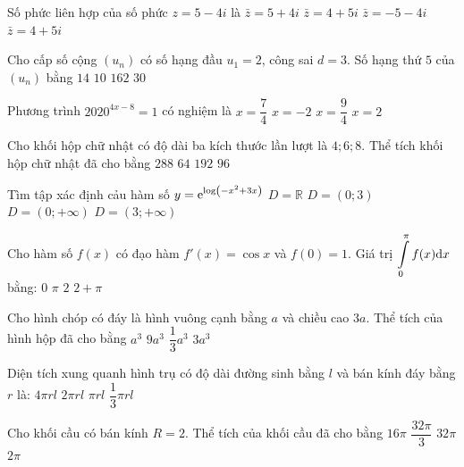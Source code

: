 \begin{ex}%
Số phức liên hợp của số phức $z=5-4 i$ là
\choice
{\True $\bar{z}=5+4 i$}
{$\bar{z}=4+5 i$}
{$\bar{z}=-5-4 i$}
{$\bar{z}=4+5 i$}

\end{ex}
\begin{ex}%
Cho cấp số cộng $\left(u_n\right)$ có số hạng đầu $u_1=2$, công sai $d=3$. Số hạng thứ $5$ của $\left(u_n\right)$ bằng
\choice
{\True $14$}
{$10$}
{$162$}
{$30$}

\end{ex}
\begin{ex}%
Phương trình $2020^{4 x-8}=1$ có nghiệm là
\choice
{$x=\dfrac{7}{4}$}
{$x=-2$}
{$x=\dfrac{9}{4}$}
{\True $x=2$}

\end{ex}
\begin{ex}%
Cho khối hộp chữ nhật có độ dài ba kích thước lần lượt là $4; 6; 8$. Thể tích khối hộp chữ nhật đã cho bằng
\choice
{$288$}
{$64$}
{\True $192$}
{$96$}

\end{ex}
\begin{ex}%
Tìm tập xác định cảu hàm số $y={\rm e}^{\log \left(-x^2+3 x\right)}$ 
\choice
{$D=\mathbb{R}$}
{$D=(0;3)$}
{$D=(0;+\infty)$}
{\True $D=(3;+\infty)$}

\end{ex}
\begin{ex}%
Cho hàm số $f(x)$ có đạo hàm $f'(x)=\cos x$ và $f(0)=1$. Giá trị $\displaystyle\displaystyle\int\limits_0^{\pi} f(x) \mathrm{d} x$ bằng:
\choice
{$0$}
{$\pi$}
{$2$}
{\True $2+\pi$}

\end{ex}
\begin{ex}%
Cho hình chóp có đáy là hình vuông cạnh bằng $a$ và chiều cao $3 a$. Thể tích của hình hộp đã cho bằng
\choice
{$a^3$}
{$9 a^3$}
{$\dfrac{1}{3} a^3$}
{\True $3 a^3$}

\end{ex}
\begin{ex}%
Diện tích xung quanh hình trụ có độ dài đường sinh bằng $l$ và bán kính đáy bằng $r$ là:
\choice
{$4\pi r l$}
{\True $2\pi r l$}
{$\pi r l$}
{$\dfrac{1}{3} \pi r l$}

\end{ex}
\begin{ex}%
Cho khối cầu có bán kính $R=2$. Thể tích của khối cầu đã cho bằng
\choice
{$16\pi$}
{\True $\dfrac{32\pi}{3}$}
{$32\pi$}
{$2\pi$}

\end{ex}
